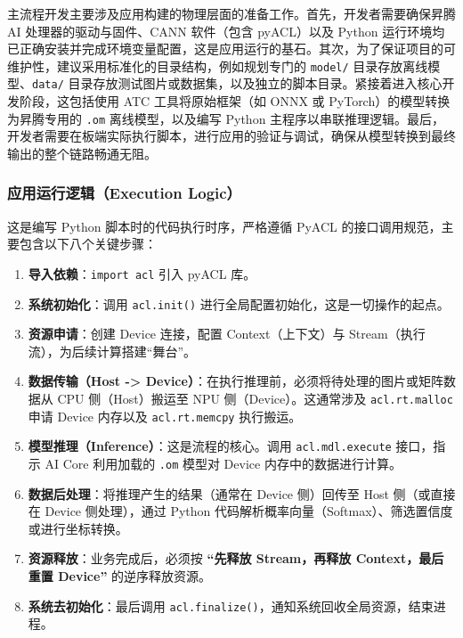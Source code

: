 主流程开发主要涉及应用构建的物理层面的准备工作。首先，开发者需要确保昇腾
AI 处理器的驱动与固件、CANN 软件（包含 pyACL）以及 Python
运行环境均已正确安装并完成环境变量配置，这是应用运行的基石。其次，为了保证项目的可维护性，建议采用标准化的目录结构，例如规划专门的
\passthrough{\lstinline!model/!}
目录存放离线模型、\passthrough{\lstinline!data/!}
目录存放测试图片或数据集，以及独立的脚本目录。紧接着进入核心开发阶段，这包括使用
ATC 工具将原始框架（如 ONNX 或 PyTorch）的模型转换为昇腾专用的
\passthrough{\lstinline!.om!} 离线模型，以及编写 Python
主程序以串联推理逻辑。最后，开发者需要在板端实际执行脚本，进行应用的验证与调试，确保从模型转换到最终输出的整个链路畅通无阻。

\subsubsection{应用运行逻辑（Execution
Logic）}\label{src-book-chapter4-h23}

这是编写 Python 脚本时的代码执行时序，严格遵循 PyACL
的接口调用规范，主要包含以下八个关键步骤：

\begin{enumerate}
\def\labelenumi{\arabic{enumi}.}
\tightlist
\item
  \textbf{导入依赖}：\passthrough{\lstinline!import acl!} 引入 pyACL
  库。
\item
  \textbf{系统初始化}：调用 \passthrough{\lstinline!acl.init()!}
  进行全局配置初始化，这是一切操作的起点。
\item
  \textbf{资源申请}：创建 Device 连接，配置 Context（上下文）与
  Stream（执行流），为后续计算搭建``舞台''。
\item
  \textbf{数据传输（Host -\textgreater{}
  Device）}：在执行推理前，必须将待处理的图片或矩阵数据从 CPU
  侧（Host）搬运至 NPU 侧（Device）。这通常涉及
  \passthrough{\lstinline!acl.rt.malloc!} 申请 Device 内存以及
  \passthrough{\lstinline!acl.rt.memcpy!} 执行搬运。
\item
  \textbf{模型推理（Inference）}：这是流程的核心。调用
  \passthrough{\lstinline!acl.mdl.execute!} 接口，指示 AI Core
  利用加载的 \passthrough{\lstinline!.om!} 模型对 Device
  内存中的数据进行计算。
\item
  \textbf{数据后处理}：将推理产生的结果（通常在 Device 侧）回传至 Host
  侧（或直接在 Device 侧处理），通过 Python
  代码解析概率向量（Softmax）、筛选置信度或进行坐标转换。
\item
  \textbf{资源释放}：业务完成后，必须按 \textbf{``先释放 Stream，再释放
  Context，最后重置 Device''} 的逆序释放资源。
\item
  \textbf{系统去初始化}：最后调用
  \passthrough{\lstinline!acl.finalize()!}，通知系统回收全局资源，结束进程。
\end{enumerate}

